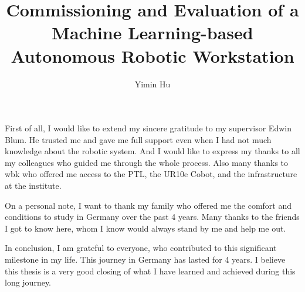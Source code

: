 \documentclass[oneside,studentpaper]{wbk}
\author{Yimin Hu}
\title{Commissioning and Evaluation of a Machine Learning-based Autonomous Robotic Workstation}
\subtitle{}
\begin{document}

\maketitle


\ifDiss

	\begin{publisherpreface}
	\end{publisherpreface}
	
	\begin{authorpreface}
	\end{authorpreface}

\else

	\newpage
	\thispagestyle{empty}
	\quad  \addtocounter{page}{-1}
	\newpage
		


	\statementoforiginality

\begin{acknowledgment}
First of all, I would like to extend my sincere gratitude to my supervisor Edwin Blum. He trusted me and gave me full support even when I had not much knowledge about the robotic system. And I would like to express my thanks to all my colleagues who guided me through the whole process. Also many thanks to wbk who offered me access to the PTL, the UR10e Cobot, and the infrastructure at the institute.

On a personal note, I want to thank my family who offered me the comfort and conditions to study in Germany over the past 4 years. Many thanks to the friends I got to know here, whom I know would always stand by me and help me out.

In conclusion, I am grateful to everyone, who contributed to this significant milestone in my life. This journey in Germany has lasted for 4 years. I believe this thesis is a very good closing of what I have learned and achieved during this long journey. 

\end{acknowledgment}
\end{document}
